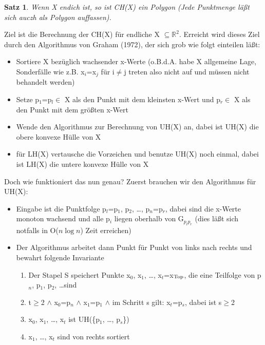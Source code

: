 \documentclass[ngerman,draft,parskip=half*,twoside]{scrreprt}
\theoremstyle{break}
\newtheorem{satz}{Satz}
\begin{document}
\begin{satz}
Wenn X endich ist, so ist CH(X) ein Polygon (Jede Punktmenge läßt sich auczh als Polygon auffassen).
\end{satz}

Ziel ist die Berechnung der CH(X) für endliche X $\subseteq \mathbb{R}^2$. Erreicht wird dieses Ziel durch den Algorithmus von Graham
(1972), der sich grob wie folgt einteilen läßt:

\begin{itemize}
\item Sortiere X bezüglich wachsender x-Werte (o.B.d.A. habe X allgemeine Lage, Sonderfälle wie z.B. x$_i$=x$_j$ für i$\not=$j treten
also nicht auf und müssen nicht behandelt werden)
\item Setze p$_1$=p$_l \in$ X als den Punkt mit dem kleinsten x-Wert und p$_r \in$ X als den Punkt mit dem größten x-Wert 
\item Wende den Algorithmus zur Berechnung von UH(X) an, dabei ist UH(X) die obere konvexe Hülle von X
\item für LH(X) vertausche die Vorzeichen und benutze UH(X) noch einmal, dabei ist LH(X) die untere konvexe Hülle von X
\end{itemize}

\begin{figure}[H]
  \centering
  \label{031203b}
\end{figure}

Doch wie funktioniert das nun genau? Zuerst brauchen wir den Algorithmus für UH(X):
\begin{itemize}
\item Eingabe ist die Punktfolge p$_l$=p$_1$, p$_2$, \ldots, p$_n$=p$_r$, dabei sind die x-Werte monoton wachsend und alle p$_i$ liegen
oberhalb von G$_{p_l p_r}$ (dies läßt sich notfalls in O($n \log n$) Zeit erreichen)
\item Der Algorithmus arbeitet dann Punkt für Punkt von links nach rechts und bewahrt folgende Invariante
  \begin{enumerate}
  \item Der Stapel S speichert Punkte x$_0$, x$_1$, \ldots, x$_t$=x$_{\textnormal{Top}}$, die eine Teilfolge von p$_n$, p$_1$, p$_2$, \ldots sind
  \item t$\geq$2 $\wedge$ x$_0$=p$_n$ $\wedge$ x$_1$=p$_1$ $\wedge$ im Schritt s gilt: x$_t$=p$_s$, dabei ist s$\geq$2
  \item x$_0$, x$_1$, \ldots, x$_t$ ist UH(\{p$_1$, \ldots, p$_s$\})
  \item x$_1$, \ldots, x$_t$ sind von rechts sortiert
  \end{enumerate}
\end{itemize}
\end{document}
